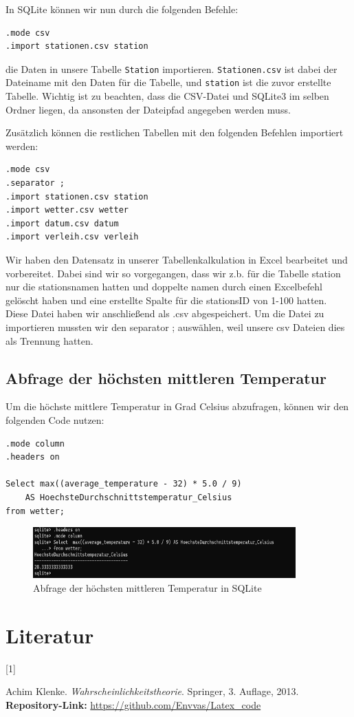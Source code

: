 \documentclass{article}
\begin{document}
In SQLite können wir nun durch die folgenden Befehle:

\begin{verbatim}
.mode csv
.import stationen.csv station
\end{verbatim}

die Daten in unsere Tabelle \texttt{Station} importieren. \texttt{Stationen.csv} ist dabei der Dateiname mit den Daten für die Tabelle, und \texttt{station} ist die zuvor erstellte Tabelle. Wichtig ist zu beachten, dass die CSV-Datei und SQLite3 im selben Ordner liegen, da ansonsten der Dateipfad angegeben werden muss.

Zusätzlich können die restlichen Tabellen mit den folgenden Befehlen importiert werden:

\begin{verbatim}
.mode csv
.separator ;
.import stationen.csv station
.import wetter.csv wetter
.import datum.csv datum
.import verleih.csv verleih
\end{verbatim}

Wir haben den Datensatz in unserer Tabellenkalkulation in Excel bearbeitet und vorbereitet. Dabei sind wir so vorgegangen, dass wir z.b. für die Tabelle station nur die stationsnamen hatten und doppelte namen durch einen Excelbefehl gelöscht haben und eine erstellte Spalte für die stationsID von 1-100 hatten. Diese Datei haben wir anschließend als .csv abgespeichert. Um die Datei zu importieren mussten wir den separator ; auswählen, weil unsere csv Dateien dies als Trennung hatten. 

\newpage 
\newpage 

\subsection{Abfrage der höchsten mittleren Temperatur}
\label{sec:highest-temp-query}

Um die höchste mittlere Temperatur in Grad Celsius abzufragen, können wir den folgenden Code nutzen:

\begin{verbatim}
.mode column
.headers on

Select max((average_temperature - 32) * 5.0 / 9) 
    AS HoechsteDurchschnittstemperatur_Celsius
from wetter;
\end{verbatim}

\begin{figure}[h!]
    \centering
    \includegraphics[width=0.9\textwidth]{letztes b.png}
    \caption{Abfrage der höchsten mittleren Temperatur in SQLite}
    \label{fig:highest-temp-query}
\end{figure}

\newpage 


\section*{Literatur}
 \hypertarget{litref}{[1]} Achim Klenke. \textit{Wahrscheinlichkeitstheorie}. Springer, 3. Auflage, 2013.
    \textbf{Repository-Link:} \url{https://github.com/Envvas/Latex_code}
\end{document}
